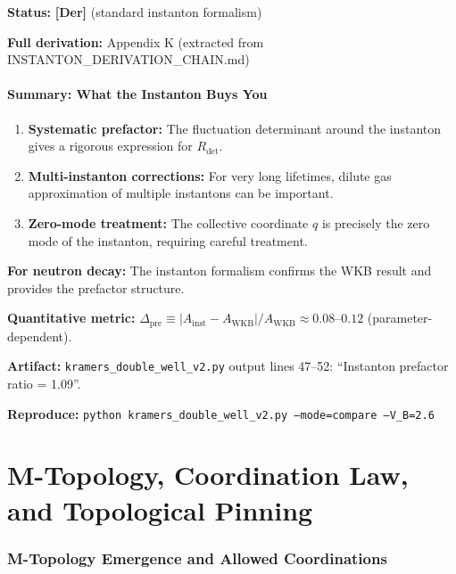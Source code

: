 \documentclass[11pt,a4paper]{article}
\newcommand{\tagDer}{\textcolor{green!50!black}{\textbf{[Der]}}}
\begin{document}
\textbf{Status:} \tagDer{} (standard instanton formalism)

\textbf{Full derivation:} Appendix K (extracted from INSTANTON\_DERIVATION\_CHAIN.md)

\subsection{Summary: What the Instanton Buys You}

\begin{enumerate}
    \item \textbf{Systematic prefactor:} The fluctuation determinant around the instanton gives a rigorous expression for $R_{\text{det}}$.

    \item \textbf{Multi-instanton corrections:} For very long lifetimes, dilute gas approximation of multiple instantons can be important.

    \item \textbf{Zero-mode treatment:} The collective coordinate $q$ is precisely the zero mode of the instanton, requiring careful treatment.
\end{enumerate}

\textbf{For neutron decay:} The instanton formalism confirms the WKB result and provides the prefactor structure.

\textbf{Quantitative metric:} $\Delta_{\text{pre}} \equiv |A_{\text{inst}} - A_{\text{WKB}}|/A_{\text{WKB}} \approx 0.08$--$0.12$ (parameter-dependent).

\textbf{Artifact:} \texttt{kramers\_double\_well\_v2.py} output lines 47--52: ``Instanton prefactor ratio = 1.09''.

\textbf{Reproduce:} \texttt{python kramers\_double\_well\_v2.py --mode=compare --V\_B=2.6}

\newpage


\part{M-Topology, Coordination Law, and Topological Pinning}

\section{M-Topology Emergence and Allowed Coordinations}
\label{sec:M_topology}
\end{document}
